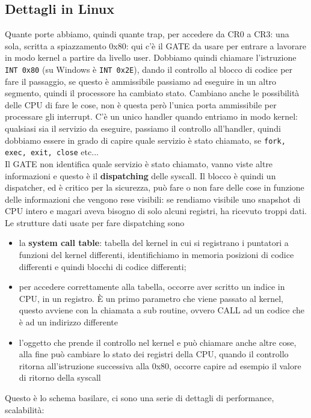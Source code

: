 \documentclass[12pt, oneside]{extbook}
\begin{document}
\subsection{Dettagli in Linux}
Quante porte abbiamo, quindi quante trap, per accedere da CR0 a CR3: una sola, scritta a spiazzamento 0x80: qui c'è il GATE da usare per entrare a lavorare in modo kernel a partire da livello user. Dobbiamo quindi chiamare l'istruzione \texttt{INT 0x80} (su Windows è \texttt{INT 0x2E}), dando il controllo al blocco di codice per fare il passaggio, se questo  è ammissibile passiamo ad eseguire in un altro segmento, quindi il processore ha cambiato stato. Cambiano anche le possibilità delle CPU di fare le cose, non è questa però l'unica porta ammissibile per processare gli interrupt. C'è un unico handler quando entriamo in modo kernel: qualsiasi sia il servizio da eseguire, passiamo il controllo all'handler, quindi dobbiamo essere in grado di capire quale servizio è stato chiamato, se \texttt{fork, exec, exit, close} etc...\\Il GATE non identifica quale servizio è stato chiamato, vanno viste altre informazioni e questo è il \textbf{dispatching} delle syscall. Il blocco è quindi un dispatcher, ed è critico per la sicurezza, può fare o non fare delle cose in funzione delle informazioni che vengono rese visibili: se rendiamo visibile uno snapshot di CPU intero e magari aveva bisogno di solo alcuni registri, ha ricevuto troppi dati. Le strutture dati usate per fare dispatching sono
\begin{itemize}
\item la \textbf{system call table}: tabella del kernel in cui si registrano i puntatori a funzioni del kernel differenti, identifichiamo in memoria posizioni di codice differenti e quindi blocchi di codice differenti;
\item per accedere correttamente alla tabella, occorre aver scritto un indice in CPU, in un registro. È un primo parametro che viene passato al kernel, questo avviene con la chiamata a sub routine, ovvero CALL ad un codice che è ad un indirizzo differente
\item l'oggetto che prende il controllo nel kernel e può chiamare anche altre cose, alla fine può cambiare lo stato dei registri della CPU, quando il controllo ritorna all'istruzione successiva alla 0x80, occorre capire ad esempio il valore di ritorno della syscall
\end{itemize}
Questo è lo schema basilare, ci sono una serie di dettagli di performance, scalabilità:
\end{document}
